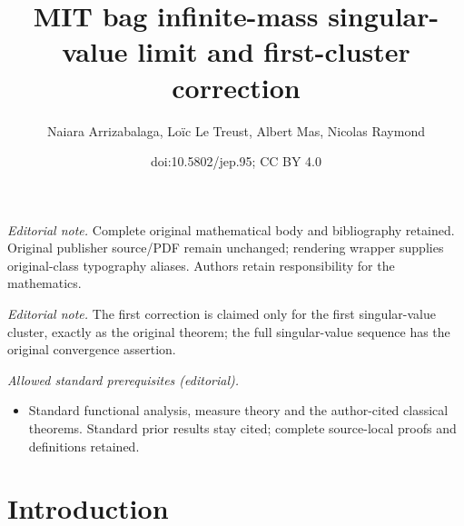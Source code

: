 \documentclass[10pt]{amsart}
\title{MIT bag infinite-mass singular-value limit and first-cluster correction}
\author{Naiara Arrizabalaga, Loïc Le Treust, Albert Mas, Nicolas Raymond}
\date{doi:10.5802/jep.95; CC BY 4.0}
\theoremstyle{plain}
\theoremstyle{definition}
\begin{document}
\maketitle
\noindent\textit{Editorial note.} Complete original mathematical body and bibliography retained. Original publisher source/PDF remain unchanged; rendering wrapper supplies original-class typography aliases. Authors retain responsibility for the mathematics.\par\medskip
\noindent\textit{Editorial note.} The first correction is claimed only for the first singular-value cluster, exactly as the original theorem; the full singular-value sequence has the original convergence assertion.\par\medskip
\noindent\textit{Allowed standard prerequisites (editorial).}\begin{itemize}
\item Standard functional analysis, measure theory and the author-cited classical theorems. Standard prior results stay cited; complete source-local proofs and definitions retained.
\end{itemize}\medskip
\tableofcontents


\section{Introduction}
\end{document}
